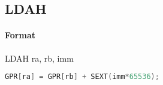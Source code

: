 \subsection{LDAH}


\paragraph{Format} LDAH ra, rb, imm

\begin{lstlisting}[language=C]
    GPR[ra] = GPR[rb] + SEXT(imm*65536);
\end{lstlisting}

